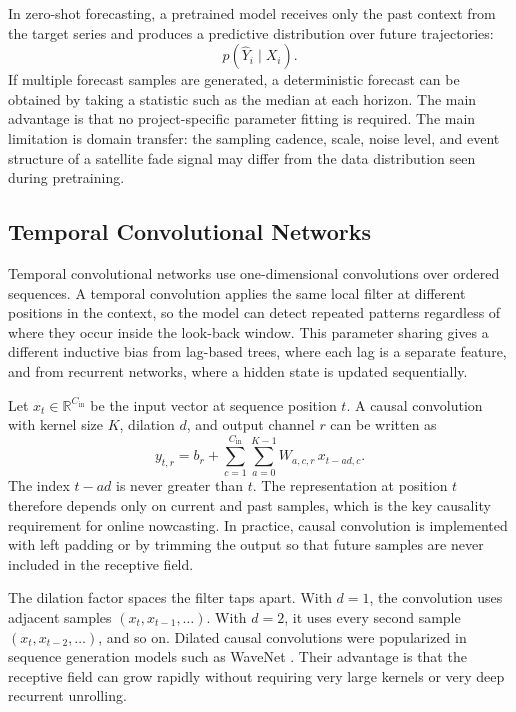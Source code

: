 In zero-shot forecasting, a pretrained model receives only the past context from
the target series and produces a predictive distribution over future
trajectories:
\[
  p(\widehat{Y}_i \mid X_i).
\]
If multiple forecast samples are generated, a deterministic forecast can be
obtained by taking a statistic such as the median at each horizon. The main
advantage is that no project-specific parameter fitting is required. The main
limitation is domain transfer: the sampling cadence, scale, noise level, and
event structure of a satellite fade signal may differ from the data distribution
seen during pretraining.


\subsection{Temporal Convolutional Networks}
\label{sec:background-tcn}

Temporal convolutional networks use one-dimensional convolutions over ordered
sequences. A temporal convolution applies the same local filter at different
positions in the context, so the model can detect repeated patterns regardless
of where they occur inside the look-back window. This parameter sharing gives a
different inductive bias from lag-based trees, where each lag is a separate
feature, and from recurrent networks, where a hidden state is updated
sequentially.

Let \(x_t\in\mathbb{R}^{C_{\mathrm{in}}}\) be the input vector at sequence
position \(t\). A causal convolution with kernel size \(K\), dilation \(d\), and
output channel \(r\) can be written as
\[
  y_{t,r}
  =
  b_r
  +
  \sum_{c=1}^{C_{\mathrm{in}}}
  \sum_{a=0}^{K-1}
  W_{a,c,r}\,x_{t-ad,c}.
\]
The index \(t-ad\) is never greater than \(t\). The representation at position
\(t\) therefore depends only on current and past samples, which is the key
causality requirement for online nowcasting. In practice, causal convolution is
implemented with left padding or by trimming the output so that future samples
are never included in the receptive field.

The dilation factor spaces the filter taps apart. With \(d=1\), the convolution
uses adjacent samples \((x_t,x_{t-1},\ldots)\). With \(d=2\), it uses every
second sample \((x_t,x_{t-2},\ldots)\), and so on. Dilated causal convolutions
were popularized in sequence generation models such as WaveNet
\cite{oord2016wavenet}. Their advantage is that the receptive field can grow
rapidly without requiring very large kernels or very deep recurrent unrolling.

